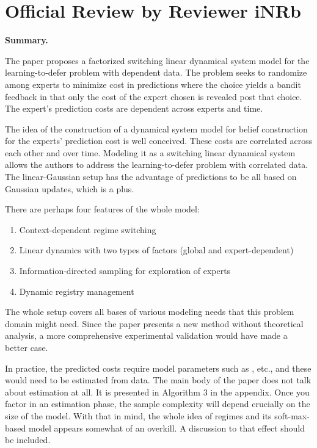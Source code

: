 \section*{Official Review by Reviewer iNRb}

\textbf{Summary.}

The paper proposes a factorized switching linear dynamical system model for the learning-to-defer problem with dependent data. The problem seeks to randomize among experts to minimize cost in predictions where the choice yields a bandit feedback in that only the cost of the expert chosen is revealed post that choice. The expert's prediction costs are dependent across experts and time.

The idea of the construction of a dynamical system model for belief construction for the experts' prediction cost is well conceived. These costs are correlated across each other and over time. Modeling it as a switching linear dynamical system allows the authors to address the learning-to-defer problem with correlated data. The linear-Gaussian setup has the advantage of predictions to be all based on Gaussian updates, which is a plus.

There are perhaps four features of the whole model:
\begin{enumerate}
    \item Context-dependent regime switching
    \item Linear dynamics with two types of factors (global and expert-dependent)
    \item Information-directed sampling for exploration of experts
    \item Dynamic registry management
\end{enumerate}

The whole setup covers all bases of various modeling needs that this problem domain might need. Since the paper presents a new method without theoretical analysis, a more comprehensive experimental validation would have made a better case.

In practice, the predicted costs require model parameters such as , etc., and these would need to be estimated from data. The main body of the paper does not talk about estimation at all. It is presented in Algorithm 3 in the appendix. Once you factor in an estimation phase, the sample complexity will depend crucially on the size of the model. With that in mind, the whole idea of regimes and its soft-max-based model appears somewhat of an overkill. A discussion to that effect should be included.

